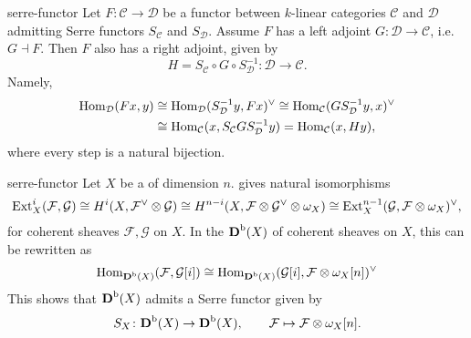 \begin{example}{serre-functor}
    Let $F \colon \mathcal{C} \to \mathcal{D}$ be a functor between $k$-linear categories $\mathcal{C}$ and $\mathcal{D}$ admitting Serre functors $S_\mathcal{C}$ and $S_\mathcal{D}$. Assume $F$ has a left adjoint $G \colon \mathcal{D} \to \mathcal{C}$, i.e. $G \dashv F$. Then $F$ also has a right adjoint, given by
    \[ H = S_\mathcal{C} \circ G \circ S_\mathcal{D}^{-1} \colon \mathcal{D} \to \mathcal{C} . \]
    Namely,
    \[ \begin{aligned} \operatorname{Hom}_\mathcal{D}(Fx, y) &\cong \operatorname{Hom}_\mathcal{D}(S_\mathcal{D}^{-1} y, Fx)^\vee \cong \operatorname{Hom}_\mathcal{C}(G S_\mathcal{D}^{-1} y, x)^\vee \\ &\cong \operatorname{Hom}_\mathcal{C}(x, S_\mathcal{C} G S_\mathcal{D}^{-1} y) = \operatorname{Hom}_\mathcal{C}(x, H y) , \end{aligned} \]
    where every step is a natural bijection.
\end{example}

\begin{example}{serre-functor}
    Let $X$ be a   of dimension $n$.  gives natural isomorphisms
    \[ \textup{Ext}_X^i(\mathcal{F}, \mathcal{G}) \cong H^i(X, \mathcal{F}^\vee \otimes \mathcal{G}) \cong H^{n - i}(X, \mathcal{F} \otimes \mathcal{G}^\vee \otimes \omega_X) \cong \textup{Ext}_X^{n - 1}(\mathcal{G}, \mathcal{F} \otimes \omega_X)^\vee , \]
    for coherent sheaves $\mathcal{F}, \mathcal{G}$ on $X$. In the  $\textbf{D}^\textup{b}(X)$ of coherent sheaves on $X$, this can be rewritten as
    \[ \operatorname{Hom}_{\textbf{D}^\textup{b}(X)}(\mathcal{F}, \mathcal{G}[i]) \cong \operatorname{Hom}_{\textbf{D}^\textup{b}(X)}(\mathcal{G}[i], \mathcal{F} \otimes \omega_X[n])^\vee \]
    This shows that $\textbf{D}^\textup{b}(X)$ admits a Serre functor given by
    \[ S_X \colon \textbf{D}^\textup{b}(X) \to \textbf{D}^\textup{b}(X), \qquad \mathcal{F} \mapsto \mathcal{F} \otimes \omega_X[n] . \]
\end{example}
